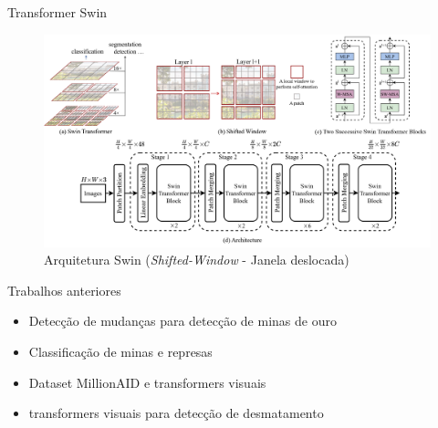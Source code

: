 \documentclass[8pt]{beamer}
\begin{document}
\begin{frame}{Transformer Swin}

    \begin{figure}[!ht]
        \centering
        \includegraphics[width=\columnwidth]{Imagens/arquitetura swin.png}
        \caption{Arquitetura Swin (\textit{Shifted-Window} - Janela deslocada) ~\cite{liu2022swin}}
        \label{fig:SWIN-arquitetura}
    \end{figure}

\end{frame}

\begin{frame}{Trabalhos anteriores}

    \begin{itemize}
        \item Detecção de mudanças para detecção de minas de ouro \cite{rs14071746}
        \item Classificação de minas e represas \cite{s20236936}
        \item Dataset MillionAID e transformers visuais ~\cite{wang2022empirical}
        \item transformers visuais para detecção de desmatamento ~\cite{9701667}
    \end{itemize}
\end{frame}
\end{document}
